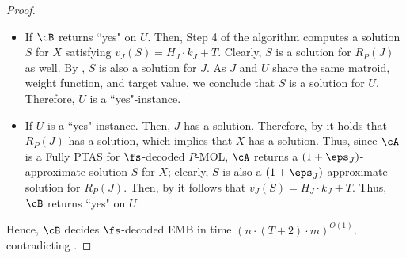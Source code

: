 \begin{proof}
	
	\begin{itemize}
		\item If $\cB$ returns ``yes" on $U$. %
		Then, Step 4 of the algorithm computes a solution $S$ for $X$ satisfying $v_J(S) = H_J \cdot k_J+T$. Clearly, $S$ is a solution for $R_P(J)$ as well. By , %
		$S$ is also a solution for $J$. As $J$ and $U$ share the same matroid, weight function, and target value, we conclude that $S$ is a solution for $U$. Therefore, $U$ is a ``yes"-instance.     
		
		
		\item If $U$ is a ``yes"-instance. Then, $J$ has a solution. Therefore, by  it holds that $R_P(J)$ has a solution, which implies that $X$ has a solution. Thus, since $\cA$ is a Fully PTAS for $\fs$-decoded $P$-MOL, $\cA$ returns a $(1+\eps_J)$-approximate solution $S$ for $X$; clearly, $S$ is also a $(1+\eps_J)$-approximate solution for $R_P(J)$. %
		Then, by  it follows that $v_J(S) = H_J \cdot k_J+T$. Thus, $\cB$ returns ``yes" on $U$.
	\end{itemize}  Hence, $\cB$ decides $\fs$-decoded EMB in time $\left(n \cdot (T+2) \cdot m\right)^{O(1)}$, contradicting .  
\end{proof}


	
	

	
